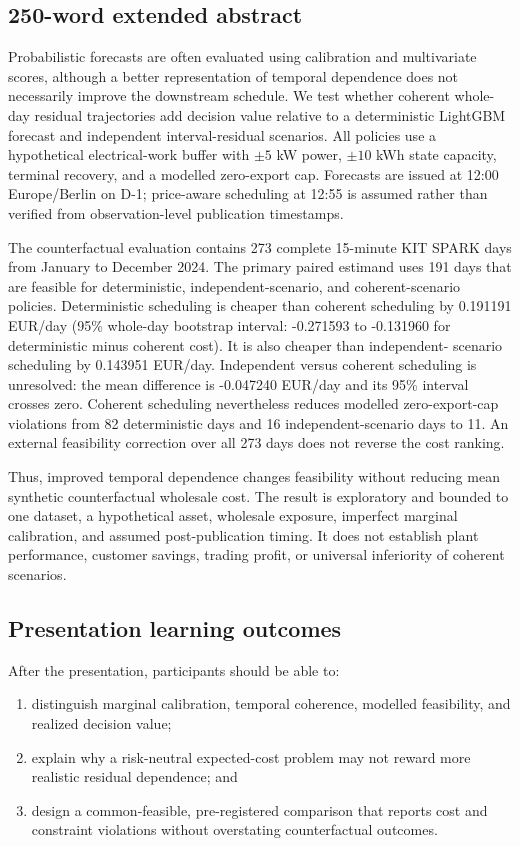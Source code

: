 \documentclass[10pt,twocolumn]{article}
\begin{document}
\subsection{250-word extended abstract}

Probabilistic forecasts are often evaluated using calibration and multivariate
scores, although a better representation of temporal dependence does not
necessarily improve the downstream schedule. We test whether coherent
whole-day residual trajectories add decision value relative to a deterministic
LightGBM forecast and independent interval-residual scenarios. All policies use
a hypothetical electrical-work buffer with $\pm5$ kW power,
$\pm10$ kWh state capacity, terminal recovery, and a modelled zero-export
cap. Forecasts are issued at 12:00 Europe/Berlin on D-1; price-aware scheduling
at 12:55 is assumed rather than verified from observation-level publication
timestamps.

The counterfactual evaluation contains 273 complete 15-minute KIT SPARK days
from January to December 2024. The primary paired estimand uses 191 days that
are feasible for deterministic, independent-scenario, and coherent-scenario
policies. Deterministic scheduling is cheaper than coherent scheduling by
0.191191 EUR/day (95\% whole-day bootstrap interval: -0.271593 to -0.131960
for deterministic minus coherent cost). It is also cheaper than independent-
scenario scheduling by 0.143951 EUR/day. Independent versus coherent scheduling
is unresolved: the mean difference is -0.047240 EUR/day and its 95\% interval
crosses zero. Coherent scheduling nevertheless reduces modelled zero-export-cap
violations from 82 deterministic days and 16 independent-scenario days to 11.
An external feasibility correction over all 273 days does not reverse
the cost ranking.

Thus, improved temporal dependence changes feasibility without reducing mean
synthetic counterfactual wholesale cost. The result is exploratory and bounded
to one dataset, a hypothetical asset, wholesale exposure, imperfect
marginal calibration, and assumed post-publication timing. It does not establish
plant performance, customer savings, trading profit, or universal inferiority
of coherent scenarios.

\subsection{Presentation learning outcomes}

After the presentation, participants should be able to:
\begin{enumerate}
  \item distinguish marginal calibration, temporal coherence, modelled
  feasibility, and realized decision value;
  \item explain why a risk-neutral expected-cost problem may not reward more
  realistic residual dependence; and
  \item design a common-feasible, pre-registered comparison that reports cost
  and constraint violations without overstating counterfactual outcomes.
\end{enumerate}
\end{document}
